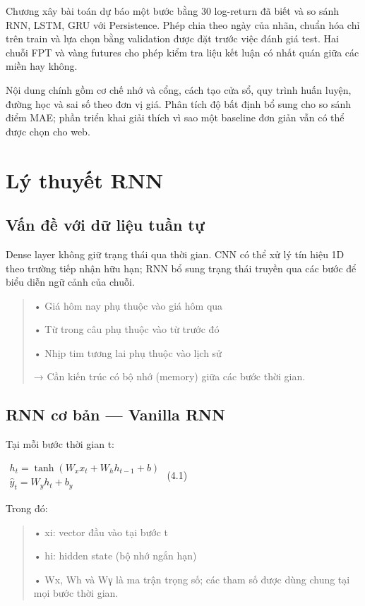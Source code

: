 Chương xây bài toán dự báo một bước bằng 30 log-return đã biết và so
sánh RNN, LSTM, GRU với Persistence. Phép chia theo ngày của nhãn, chuẩn
hóa chỉ trên train và lựa chọn bằng validation được đặt trước việc đánh
giá test. Hai chuỗi FPT và vàng futures cho phép kiểm tra liệu kết luận
có nhất quán giữa các miền hay không.

Nội dung chính gồm cơ chế nhớ và cổng, cách tạo cửa sổ, quy trình huấn
luyện, đường học và sai số theo đơn vị giá. Phân tích độ bất định bổ
sung cho so sánh điểm MAE; phần triển khai giải thích vì sao một
baseline đơn giản vẫn có thể được chọn cho web.

\section{Lý thuyết RNN}\label{luxfd-thuyux1ebft-RNN}

\subsection{Vấn đề với dữ liệu tuần tự}\label{vux1ea5n-ux111ux1ec1-vux1edbi-dux1eef-liux1ec7u-tuux1ea7n-tux1ef1}

Dense layer không giữ trạng thái qua thời gian. CNN có thể xử lý tín
hiệu 1D theo trường tiếp nhận hữu hạn; RNN bổ sung trạng thái truyền qua
các bước để biểu diễn ngữ cảnh của chuỗi.

\begin{quote}
• Giá hôm nay phụ thuộc vào giá hôm qua

• Từ trong câu phụ thuộc vào từ trước đó

• Nhịp tim tương lai phụ thuộc vào lịch sử

→ Cần kiến trúc có bộ nhớ (memory) giữa các bước thời gian.
\end{quote}

\subsection{RNN cơ bản --- Vanilla RNN}\label{RNN-cux1a1-bux1ea3n-vanilla-RNN}

Tại mỗi bước thời gian t:

\(\begin{array}{r}
h_{t} = \tanh(W_{x}x_{t} + W_{h}h_{t - 1} + b) \\
{\hat{y}}_{t} = W_{y}h_{t} + b_{y}
\end{array}\) (4.1)

Trong đó:

\begin{quote}
• xi: vector đầu vào tại bước t

• hi: hidden state (bộ nhớ ngắn hạn)

• Wx, Wh và Wγ là ma trận trọng số; các tham số được dùng chung tại mọi
bước thời gian.
\end{quote}

